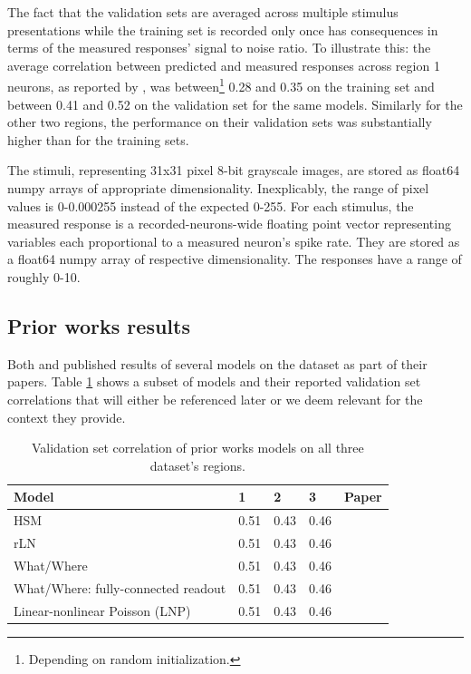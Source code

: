 The fact that the validation sets are averaged across multiple stimulus presentations while the training set is recorded only once has consequences in terms of the measured responses’ signal to noise ratio. To illustrate this: the average correlation between predicted and measured responses across region 1 neurons, as reported by \cite{antolik}, was between\footnote{Depending on random initialization.} 0.28 and 0.35 on the training set and between 0.41 and 0.52 on the validation set for the same models. Similarly for the other two regions, the performance on their validation sets was substantially higher than for the training sets. 

The stimuli, representing 31x31 pixel 8-bit grayscale images, are stored as float64 numpy arrays of appropriate dimensionality. Inexplicably, the range of pixel values is 0-0.000255 instead of the expected 0-255. For each stimulus, the measured response is a recorded-neurons-wide floating point vector representing variables each proportional to a measured neuron’s spike rate. They are stored as a float64 numpy array of respective dimensionality. The responses have a range of roughly 0-10.

\subsection{Prior works results}\label{ch:4.1.2}

Both \cite{antolik} and \cite{klindt} published results of several models on the \citeauthor{antolik} dataset as part of their papers. Table \ref{tab:4.2} shows a subset of models and their reported validation set correlations that will either be referenced later or we deem relevant for the context they provide.

\begin{table}[ht]
    \renewcommand{\arraystretch}{1.0}
    \centering
    \begin{tabular}{l|l|l|l|l}
        \toprule
        \textbf{Model} & \textbf{1} & \textbf{2} & \textbf{3} & \textbf{Paper} \\ \midrule
        HSM & 0.51 & 0.43 & 0.46 & \citeauthor{antolik} \\ 
        rLN & 0.51 & 0.43 & 0.46 & \citeauthor{antolik} \\ 
        What/Where & 0.51 & 0.43 & 0.46 & \citeauthor{antolik} \\ 
        What/Where: fully-connected readout & 0.51 & 0.43 & 0.46 & \citeauthor{klindt} \\ 
        Linear-nonlinear Poisson (LNP) & 0.51 & 0.43 & 0.46 & \citeauthor{klindt} \\ \bottomrule
    \end{tabular}
    \caption[Performance of prior works.]{Validation set correlation of prior works models on all three dataset’s regions.}
    \label{tab:4.2}
    \renewcommand{\arraystretch}{1.0}
\end{table}

